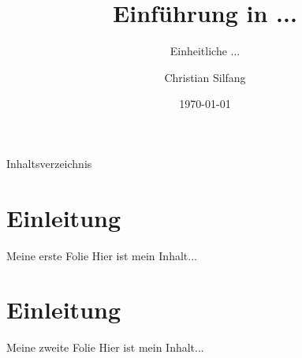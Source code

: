 \documentclass[aspectratio=169]{beamer}
\title[Intro]{Einführung in ...}
\subtitle{Einheitliche ...}
\author[C. Silfang]{Christian Silfang}
\date{\today}
\begin{document}
\begin{frame}
\titlepage
\end{frame}

\begin{frame}{Inhaltsverzeichnis}
\tableofcontents
\end{frame}

\section{Einleitung}

\begin{frame}{Meine erste Folie}
Hier ist mein Inhalt...
\end{frame}

\section{Einleitung}

\begin{frame}{Meine zweite Folie}
Hier ist mein Inhalt...
\end{frame}
\end{document}
